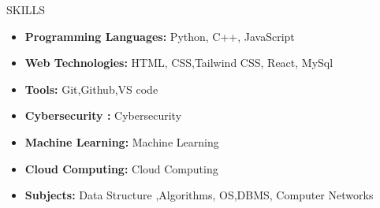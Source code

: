 \documentclass{resume}
\begin{document}
\vspace{-0.2em}
\begin{rSection}{SKILLS}
    
        \begin{itemize}
            \item \textbf{Programming Languages:} Python, C++, JavaScript
            \item \textbf{Web Technologies:} HTML, CSS,Tailwind CSS, React, MySql
            \item \textbf{Tools:} Git,Github,VS code
            \item \textbf{Cybersecurity :} Cybersecurity
            \item \textbf{Machine Learning:} Machine Learning
            \item \textbf{Cloud Computing:} Cloud Computing
            \item \textbf{Subjects:} Data Structure ,Algorithms, OS,DBMS, Computer Networks
        \end{itemize}
        
\end{rSection}
\end{document}
